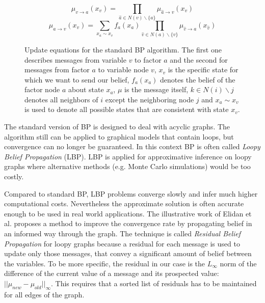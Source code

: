 \begin{figure}
\label{eqn:bp_message}
\begin{equation*}                                                            
\mu_{v\rightarrow a}(x_v) = \prod_{\hat a \in N(v)\backslash \{a\}} \mu_{\hat a\rightarrow v}(x_v)
\end{equation*}
\begin{equation*}                                                            
\mu_{a\rightarrow v}(x_v) = \sum_{x_a \sim x_v}f_a(x_a) \prod_{\hat v \in N(a)\backslash \{v\}} \mu_{\hat v\rightarrow a}(x_{\hat v})
\end{equation*}
\caption{Update equations for the standard BP algorithm. The first one describes messages from variable $v$ to factor $a$ and the second for messages from factor $a$ to variable node $v$, $x_v$ is the specific state for which we want to send our belief, $f_a(x_a)$ denotes the belief of the factor node $a$ about state $x_a$, $\mu$ is the message itself, $k \in N(i)\backslash j$ denotes all neighbors of $i$ except the neighboring node $j$ and $x_a \sim x_v$ is used to denote all possible states that are consistent with state $x_v$.}
\end{figure}

The standard version of BP is designed to deal with acyclic graphs. The algorithm still can be applied to graphical models that contain loops, but convergence can no longer be guaranteed. In this context BP is often called \textit{Loopy Belief Propagation} (LBP). LBP is applied for approximative inference on loopy graphs where alternative methods (e.g. Monte Carlo simulations) would be too costly. 

Compared to standard BP, LBP problems converge slowly and infer much higher computational costs. Nevertheless the approximate solution is often accurate enough to be used in real world applications. The illustrative work of Elidan et al. \cite{elidan2012residual} proposes a method to improve the convergence rate by propagating belief in an informed way through the graph. The technique is called \textit{Residual Belief Propagation} for loopy graphs because a residual for each message is used to update only those messages, that convey a significant amount of belief between the variables. To be more specific, the residual in our case is the $L_\infty$ norm of the difference of the current value of a message and its prospected value: $||\mu_{new} - \mu_{old}||_\infty$. This requires that a sorted list of residuals has to be maintained for all edges of the graph.


